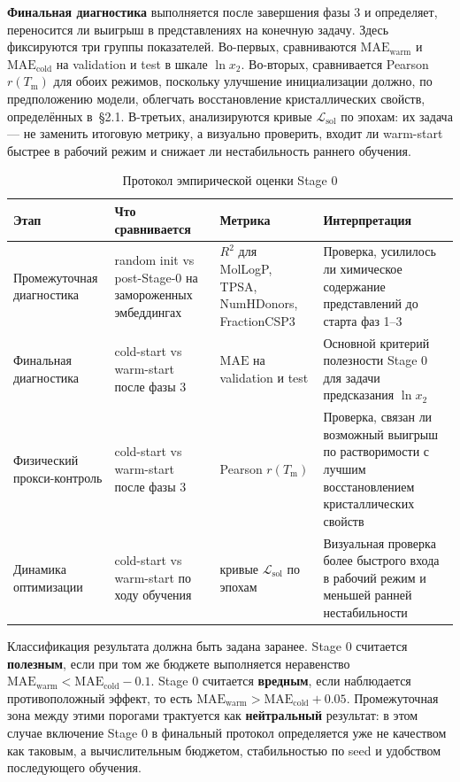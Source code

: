 \documentclass[11pt]{article}
\begin{document}
\textbf{Финальная диагностика} выполняется после завершения фазы 3 и определяет, переносится ли выигрыш в представлениях на конечную задачу. Здесь фиксируются три группы показателей. Во-первых, сравниваются $\mathrm{MAE}_{\mathrm{warm}}$ и $\mathrm{MAE}_{\mathrm{cold}}$ на validation и test в шкале $\ln x_2$. Во-вторых, сравнивается Pearson $r(T_{\mathrm{m}})$ для обоих режимов, поскольку улучшение инициализации должно, по предположению модели, облегчать восстановление кристаллических свойств, определённых в~\S2.1. В-третьих, анализируются кривые $\mathcal{L}_{\mathrm{sol}}$ по эпохам: их задача --- не заменить итоговую метрику, а визуально проверить, входит ли warm-start быстрее в рабочий режим и снижает ли нестабильность раннего обучения.

\begin{table}[H]
\small
\setlength{\tabcolsep}{5pt}
\caption{Протокол эмпирической оценки Stage 0}
\begin{tabularx}{\textwidth}{P{0.21\textwidth}P{0.28\textwidth}P{0.24\textwidth}Y}
\textbf{Этап} & \textbf{Что сравнивается} & \textbf{Метрика} & \textbf{Интерпретация} \\
\hline
Промежуточная диагностика & random init vs post-Stage-0 на замороженных эмбеддингах & $R^2$ для MolLogP, TPSA, NumHDonors, FractionCSP3 & Проверка, усилилось ли химическое содержание представлений до старта фаз 1--3 \\

Финальная диагностика & cold-start vs warm-start после фазы 3 & $\mathrm{MAE}$ на validation и test & Основной критерий полезности Stage 0 для задачи предсказания $\ln x_2$ \\

Физический прокси-контроль & cold-start vs warm-start после фазы 3 & Pearson $r(T_{\mathrm{m}})$ & Проверка, связан ли возможный выигрыш по растворимости с лучшим восстановлением кристаллических свойств \\

Динамика оптимизации & cold-start vs warm-start по ходу обучения & кривые $\mathcal{L}_{\mathrm{sol}}$ по эпохам & Визуальная проверка более быстрого входа в рабочий режим и меньшей ранней нестабильности \\
\end{tabularx}
\end{table}

Классификация результата должна быть задана заранее. Stage 0 считается \textbf{полезным}, если при том же бюджете выполняется неравенство $\mathrm{MAE}_{\mathrm{warm}} < \mathrm{MAE}_{\mathrm{cold}} - 0.1$. Stage 0 считается \textbf{вредным}, если наблюдается противоположный эффект, то есть $\mathrm{MAE}_{\mathrm{warm}} > \mathrm{MAE}_{\mathrm{cold}} + 0.05$. Промежуточная зона между этими порогами трактуется как \textbf{нейтральный} результат: в этом случае включение Stage 0 в финальный протокол определяется уже не качеством как таковым, а вычислительным бюджетом, стабильностью по seed и удобством последующего обучения.
\end{document}

